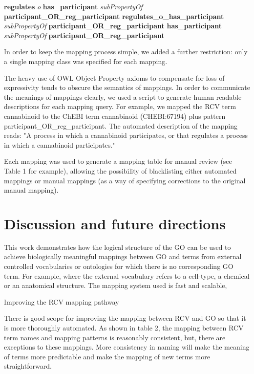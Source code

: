 \documentclass[runningheads,a4paper]{llncs}
\begin{document}
{\textbf{regulates} \textit{o} \textbf{has_participant} \textit{subPropertyOf}
\textbf{participant_OR_reg_participant}
\textbf{regulates_o_has_participant} \textit{subPropertyOf} \textbf{participant_OR_reg_participant}
\textbf{has_participant} \textit{subPropertyOf} \textbf{participant_OR_reg_participant}


In order to keep the mapping process simple, we added a further restriction: only a single mapping class was specified for each mapping.  

The heavy use of OWL Object Property axioms to compensate for loss of expressivity tends to obscure the semantics of mappings. In order to communicate the meanings of mappings clearly, we used a script to generate human readable descriptions for each mapping query.  For example, we mapped the RCV term cannabinoid to the ChEBI term cannabinoid (CHEBI:67194) plus pattern participant_OR_reg_participant.  The automated description of the mapping reads:  "A process in which a cannabinoid participates, or that regulates a process in which a cannabinoid participates."

Each mapping was used to generate a mapping table for manual review (see Table 1 for example), allowing the possibility of blacklisting either automated mappings or manual mappings (as a way of specifying corrections to the original manual mapping).


\section{Discussion and future directions}

This work demonstrates how the logical structure of the GO can be used to achieve biologically meaningful mappings between GO and terms from external controlled vocabularies or ontologies for which there is no corresponding GO term.  For example, where the external vocabulary refers to a cell-type, a chemical or an anatomical structure.  The mapping system used is fast and scalable,  

Improving the RCV mapping pathway

There is good scope for improving the mapping between RCV and GO so that it is more thoroughly automated. As shown in table 2, the mapping between RCV term names and mapping patterns is reasonably consistent, but, there are exceptions to these mappings.  More consistency in naming will make the meaning of terms more predictable and make the mapping of new terms more straightforward. 

}
\end{document}
